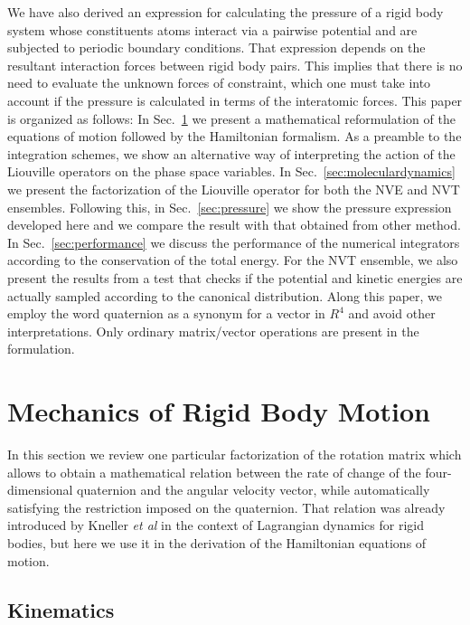 \documentclass[aip,jcp,reprint,amsmath,amssymb]{revtex4-1}
\begin{document}
We have also derived an expression for calculating the pressure of a rigid body system whose constituents atoms interact via a pairwise potential and are subjected to periodic boundary conditions. That expression depends on the resultant interaction forces between rigid body pairs. This implies that there is no need to evaluate the unknown forces of constraint, which one must take into account if the pressure is calculated in terms of the interatomic forces. This paper is organized as follows: In Sec.~\ref{sec:mechanics} we present a mathematical reformulation of the equations of motion followed by the Hamiltonian formalism. As a preamble to the integration schemes, we show an alternative way of interpreting the action of the Liouville operators on the phase space variables. In Sec.~\ref{sec:moleculardynamics} we present the factorization of the Liouville operator for both the NVE and NVT ensembles. Following this, in Sec.~\ref{sec:pressure} we show the pressure expression developed here and we compare the result with that obtained from other method. In Sec.~\ref{sec:performance} we discuss the performance of the numerical integrators according to the conservation of the total energy. For the NVT ensemble, we also present the results from a test that checks if the potential and kinetic energies are actually sampled according to the canonical distribution. Along this paper, we employ the word quaternion as a synonym for a vector in $R^4$ and avoid other interpretations. Only ordinary matrix/vector operations are present in the formulation.


\section{Mechanics of Rigid Body Motion}
\label{sec:mechanics}
In this section we review one particular factorization of the rotation matrix which allows to obtain a mathematical relation between the rate of change of the four-dimensional quaternion and the angular velocity vector, while automatically satisfying the restriction imposed on the quaternion. That relation was already introduced by Kneller \textit{et al}\cite{Kneller1994} in the context of Lagrangian dynamics for rigid bodies, but here we use it in the derivation of the Hamiltonian equations of motion.

\subsection{Kinematics}
\end{document}

